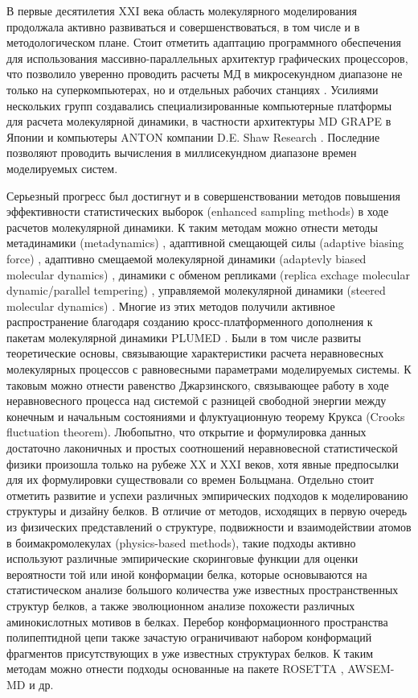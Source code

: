 В первые десятилетия XXI века область молекулярного моделирования продолжала активно развиваться и совершенствоваться, в том числе и в методологическом плане. Стоит отметить адаптацию программного обеспечения для использования массивно-параллельных архитектур графических процессоров, что позволило уверенно проводить расчеты МД в микросекундном диапазоне не только на суперкомпьютерах, но и отдельных рабочих станциях \cite{noauthor_nvidia_nodate}.  Усилиями нескольких групп создавались специализированные компьютерные платформы для расчета молекулярной динамики, в частности архитектуры MD GRAPE в Японии \cite{ohmura_mdgrape-4_2014} и компьютеры ANTON компании D.E. Shaw Research \cite{shaw_anton_2014}. Последние позволяют проводить вычисления в миллисекундном диапазоне времен моделируемых систем.

Серьезный прогресс был достигнут и в совершенствовании методов повышения эффективности статистических выборок (enhanced sampling methods) в ходе расчетов молекулярной динамики. К таким методам можно отнести методы метадинамики (metadynamics) \cite{laio_escaping_2002}, адаптивной смещающей силы (adaptive biasing force) \cite{lesage_smoothed_2017}, адаптивно смещаемой молекулярной динамики (adaptevly biased molecular dynamics) \cite{marchi_adiabatic_1999}, динамики с обменом репликами (replica exchage molecular dynamic/parallel tempering) \cite{sugita_replica-exchange_1999}, управляемой молекулярной динамики (steered molecular dynamics) \cite{shaytan_neravnovesnaya_2006}. Многие из этих методов получили активное распространение благодаря созданию кросс-платформенного дополнения к пакетам молекулярной динамики PLUMED \cite{bonomi_promoting_2019}. Были в том числе развиты теоретические основы, связывающие характеристики расчета неравновесных молекулярных процессов с равновесными параметрами моделируемых системы. К таковым можно отнести равенство Джарзинского, связывающее работу в ходе неравновесного процесса над системой с разницей свободной энергии между конечным и начальным состояниями \cite{jarzynski_nonequilibrium_1997} и флуктуационную теорему Крукса (Crooks fluctuation theorem)\cite{crooks_entropy_1999}. Любопытно, что открытие и формулировка данных достаточно лаконичных и простых соотношений неравновесной статистической физики произошла только на рубеже XX и XXI веков, хотя явные предпосылки для их формулировки существовали со времен Больцмана. Отдельно стоит отметить развитие и успехи различных эмпирических подходов к моделированию структуры и дизайну белков. В отличие от методов, исходящих в первую очередь из физических представлений о структуре, подвижности и взаимодействии атомов в боимакромолекулах  (physics-based methods), такие подходы активно используют различные эмпирические скоринговые функции для оценки вероятности той или иной конформации белка, которые основываются на статистическом анализе большого количества уже известных пространственных структур белков, а также эволюционном анализе похожести различных аминокислотных мотивов в белках. Перебор конформационного пространства полипептидной цепи также зачастую ограничивают набором конформаций фрагментов присутствующих в уже известных структурах белков. К таким методам можно отнести подходы основанные на пакете ROSETTA \cite{leman_macromolecular_2020}, AWSEM-MD \cite{wu_awsem-idp_2018} и др.

